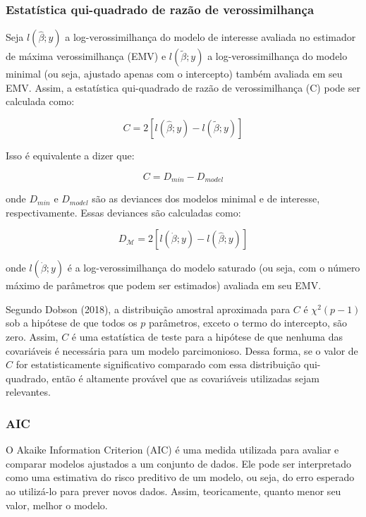 \documentclass[
  twocolumn]{article}
\begin{document}
\subsubsection{Estatística qui-quadrado de razão de
verossimilhança}\label{estatuxedstica-qui-quadrado-de-razuxe3o-de-verossimilhanuxe7a}

Seja \(l(\hat{\beta}; y)\) a log-verossimilhança do modelo de interesse
avaliada no estimador de máxima verossimilhança (EMV) e
\(l(\tilde{\beta}; y)\) a log-verossimilhança do modelo minimal (ou
seja, ajustado apenas com o intercepto) também avaliada em seu EMV.
Assim, a estatística qui-quadrado de razão de verossimilhança (C) pode
ser calculada como:

\[
C = 2[l(\hat{\beta}; y) - l(\tilde{\beta}; y)]
\]

Isso é equivalente a dizer que:

\[
C = D_{min} - D_{model}
\]

onde \(D_{min}\) e \(D_{model}\) são as deviances dos modelos minimal e
de interesse, respectivamente. Essas deviances são calculadas como:

\[
D_{\mathcal{M}} = 2[l(\dot{\beta}; y) - l(\hat{\beta}; y)]
\]

onde \(l(\dot{\beta}; y)\) é a log-verossimilhança do modelo saturado
(ou seja, com o número máximo de parâmetros que podem ser estimados)
avaliada em seu EMV.

Segundo Dobson (2018), a distribuição amostral aproximada para \(C\) é
\(\chi^2(p-1)\) sob a hipótese de que todos os \(p\) parâmetros, exceto
o termo do intercepto, são zero. Assim, \(C\) é uma estatística de teste
para a hipótese de que nenhuma das covariáveis é necessária para um
modelo parcimonioso. Dessa forma, se o valor de \(C\) for
estatisticamente significativo comparado com essa distribuição
qui-quadrado, então é altamente provável que as covariáveis utilizadas
sejam relevantes.

\subsubsection{AIC}\label{aic}

O Akaike Information Criterion (AIC) é uma medida utilizada para avaliar
e comparar modelos ajustados a um conjunto de dados. Ele pode ser
interpretado como uma estimativa do risco preditivo de um modelo, ou
seja, do erro esperado ao utilizá-lo para prever novos dados. Assim,
teoricamente, quanto menor seu valor, melhor o modelo.
\end{document}
